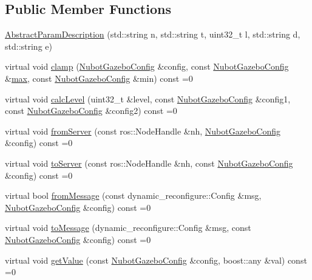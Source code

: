 \subsection*{Public Member Functions}
\begin{DoxyCompactItemize}
\item 
\hyperlink{classnubot__gazebo_1_1NubotGazeboConfig_1_1AbstractParamDescription_a501c4e1235512fdf8f094093a1745873}{Abstract\-Param\-Description} (std\-::string n, std\-::string t, uint32\-\_\-t l, std\-::string d, std\-::string e)
\item 
virtual void \hyperlink{classnubot__gazebo_1_1NubotGazeboConfig_1_1AbstractParamDescription_ab74d560ba0902fdbebdcf572f3c863e3}{clamp} (\hyperlink{classnubot__gazebo_1_1NubotGazeboConfig}{Nubot\-Gazebo\-Config} \&config, const \hyperlink{classnubot__gazebo_1_1NubotGazeboConfig}{Nubot\-Gazebo\-Config} \&\hyperlink{NubotGazeboConfig_8dox_a55c9de72d9f3630abdf51bfe39c191dd}{max}, const \hyperlink{classnubot__gazebo_1_1NubotGazeboConfig}{Nubot\-Gazebo\-Config} \&min) const =0
\item 
virtual void \hyperlink{classnubot__gazebo_1_1NubotGazeboConfig_1_1AbstractParamDescription_ac3f8ee47d39c841ed0e3845f15308aad}{calc\-Level} (uint32\-\_\-t \&level, const \hyperlink{classnubot__gazebo_1_1NubotGazeboConfig}{Nubot\-Gazebo\-Config} \&config1, const \hyperlink{classnubot__gazebo_1_1NubotGazeboConfig}{Nubot\-Gazebo\-Config} \&config2) const =0
\item 
virtual void \hyperlink{classnubot__gazebo_1_1NubotGazeboConfig_1_1AbstractParamDescription_aba453051969faad20732810d3986a94b}{from\-Server} (const ros\-::\-Node\-Handle \&nh, \hyperlink{classnubot__gazebo_1_1NubotGazeboConfig}{Nubot\-Gazebo\-Config} \&config) const =0
\item 
virtual void \hyperlink{classnubot__gazebo_1_1NubotGazeboConfig_1_1AbstractParamDescription_a02c545d049eb544dcffe0af14d5c4ad3}{to\-Server} (const ros\-::\-Node\-Handle \&nh, const \hyperlink{classnubot__gazebo_1_1NubotGazeboConfig}{Nubot\-Gazebo\-Config} \&config) const =0
\item 
virtual bool \hyperlink{classnubot__gazebo_1_1NubotGazeboConfig_1_1AbstractParamDescription_ae22fff1da404b3b0979c2c570b58301e}{from\-Message} (const dynamic\-\_\-reconfigure\-::\-Config \&msg, \hyperlink{classnubot__gazebo_1_1NubotGazeboConfig}{Nubot\-Gazebo\-Config} \&config) const =0
\item 
virtual void \hyperlink{classnubot__gazebo_1_1NubotGazeboConfig_1_1AbstractParamDescription_a1b4f9816a2a1d04354dd01946bd8059e}{to\-Message} (dynamic\-\_\-reconfigure\-::\-Config \&msg, const \hyperlink{classnubot__gazebo_1_1NubotGazeboConfig}{Nubot\-Gazebo\-Config} \&config) const =0
\item 
virtual void \hyperlink{classnubot__gazebo_1_1NubotGazeboConfig_1_1AbstractParamDescription_a01b48d9c48bd79f8ee98e0083aa6ced8}{get\-Value} (const \hyperlink{classnubot__gazebo_1_1NubotGazeboConfig}{Nubot\-Gazebo\-Config} \&config, boost\-::any \&val) const =0
\end{DoxyCompactItemize}


